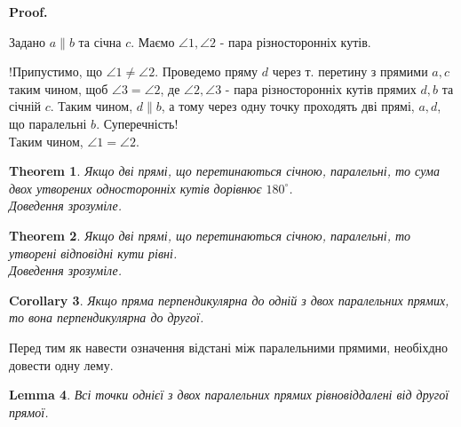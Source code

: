 \documentclass[a4paper, 10pt]{article}
\makeatletter
\theoremstyle{theoremdd}
\newtheorem{theorem}{Theorem}[subsection]
\theoremstyle{theoremdd}
\theoremstyle{theoremdd}
\theoremstyle{theoremdd}
\theoremstyle{theoremdd}
\theoremstyle{theoremdd}
\theoremstyle{theoremdd}
\theoremstyle{theoremdd}
\newtheorem{lemma}[theorem]{Lemma}
\theoremstyle{theoremdd}
\newtheorem{corollary}[theorem]{Corollary}
\renewenvironment{proof}[1][Proof.\\]{\par
\pushQED{\hfill \qed}%
\normalfont \topsep6\p@\@plus6\p@\relax
\trivlist
\item\relax
{\bfseries
#1\@addpunct{.}}\hspace\labelsep\ignorespaces
}{%
\popQED\endtrivlist\@endpefalse
}
\makeatother
\begin{document}
\begin{proof}
Задано $a \parallel b$ та січна $c$. Маємо $\angle 1, \angle 2$ - пара різносторонніх кутів.
\begin{figure}[H]
\centering
{}
\end{figure}
!Припустимо, що $\angle 1 \neq \angle 2$. Проведемо пряму $d$ через т. перетину з прямими $a,c$ таким чином, щоб $\angle 3 = \angle 2$, де $\angle 2, \angle 3$ - пара різносторонніх кутів прямих $d,b$ та січній $c$. Таким чином, $d \parallel b$, а тому через одну точку проходять дві прямі, $a,d$, що паралельні $b$. Суперечність!\\
Таким чином, $\angle 1 = \angle 2$.
\end{proof}

\begin{theorem}
Якщо дві прямі, що перетинаються січною, паралельні, то сума двох утворених односторонніх кутів дорівнює $180^\circ$.\\
\textit{Доведення зрозуміле.}
\end{theorem}

\begin{theorem}
Якщо дві прямі, що перетинаються січною, паралельні, то утворені відповідні кути рівні.\\
\textit{Доведення зрозуміле.}
\end{theorem}

\begin{corollary}
Якщо пряма перпендикулярна до одній з двох паралельних прямих, то вона перпендикулярна до другої.
\end{corollary}

Перед тим як навести означення відстані між паралельними прямими, необіхдно довести одну лему.
\begin{lemma}
Всі точки однієї з двох паралельних прямих рівновіддалені від другої прямої.
\end{lemma}
\end{document}
